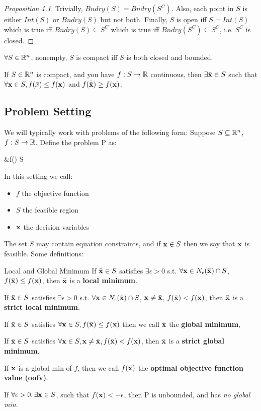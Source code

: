 \begin{proof}[Proposition 1.1]
Trivially, $Bndry(S) = Bndry(S^C)$.
Also, each point in $S$ is either $Int(S)$ or $Bndry(S)$ but not both.
Finally, $S$ is open iff $S = Int(S)$ which is true iff $Bndry(S) \subseteq S^C$
which is true iff $Bndry(S^C) \subseteq S^C$, i.e. $S^C$ is closed.
\end{proof}

\begin{theo}{}{}
$\forall S \in \mathbb{R}^n$, nonempty, $S$ is compact iff $S$ is
both closed and bounded.
\end{theo}

\begin{theo}{}{}
If $S \in \mathbb{R}^n$ is compact, and you have $f: S \rightarrow \mathbb{R}$ continuous, 
then $\exists \bar{\mathbf{x}} \in S$ such that
$\forall \mathbf{x} \in S, f(\bar{x}) \leq f(\mathbf{x})$ and $f(\bar{\bar{\mathbf{x}}}) \geq f(\mathbf{x})$.
\end{theo}

\subsection{Problem Setting}

We will typically work with problems of the following form:
Suppose $S \subseteq \mathbb{R}^n$, $f: S \rightarrow \mathbb{R}$.
Define the problem P as: 
\begin{frml}
	\min \;&f(\vx) \st \vx \in S
\end{frml}

In this setting we call:
\begin{itemize}
	\item
		$f$ the objective function
	\item
		$S$ the feasible region
	\item
		$\mathbf{x}$ the decision variables
\end{itemize}
The set $S$ may contain equation constraints, and if $\mathbf{x} \in S$ then we say that
$\mathbf{x}$ is feasible.
Some definitions:

\begin{defn}{Local and Global Minimum}{}
If $\bar{\mathbf{x}} \in S$ satisfies $\exists \epsilon > 0$ s.t. 
$\forall \mathbf{x} \in N_{\epsilon}(\bar{\mathbf{x}}) \cap S$, $f(\bar{\mathbf{x}}) \leq f(\mathbf{x})$, then
$\bar{\mathbf{x}}$ is a \textbf{local minimum}.

If $\bar{\mathbf{x}} \in S$ satisfies $\exists \epsilon > 0$ s.t. 
$\forall \mathbf{x} \in N_{\epsilon}(\bar{\mathbf{x}}) \cap S$, $\mathbf{x} \neq \bar{\mathbf{x}}$, $f(\bar{\mathbf{x}}) < f(\mathbf{x})$, then
$\bar{\mathbf{x}}$ is a \textbf{strict local minimum}.

\bigskip

If $\bar{\mathbf{x}} \in S$ satisfies $\forall \mathbf{x} \in S, f(\bar{\mathbf{x}}) \leq f(\mathbf{x})$ 
then we call $\bar{\mathbf{x}}$ the \textbf{global minimum}, 

If $\bar{\mathbf{x}} \in S$ satisfies 
$\forall \mathbf{x} \in S, \mathbf{x} \neq \bar{\mathbf{x}}, f(\bar{\mathbf{x}}) < f(\mathbf{x})$, 
then $\bar{\mathbf{x}}$ is a \textbf{strict global minimum}.

\bigskip
If $\bar{\mathbf{x}}$ is a global min of $f$, then we call $f(\bar{\mathbf{x}})$ the 
\textbf{optimal objective function value (oofv)}.
\end{defn}

If $\forall \epsilon > 0, \exists \mathbf{x} \in S$, such that $f(\mathbf{x}) < -\epsilon$,
then P is unbounded, and has \textit{no global min}.
